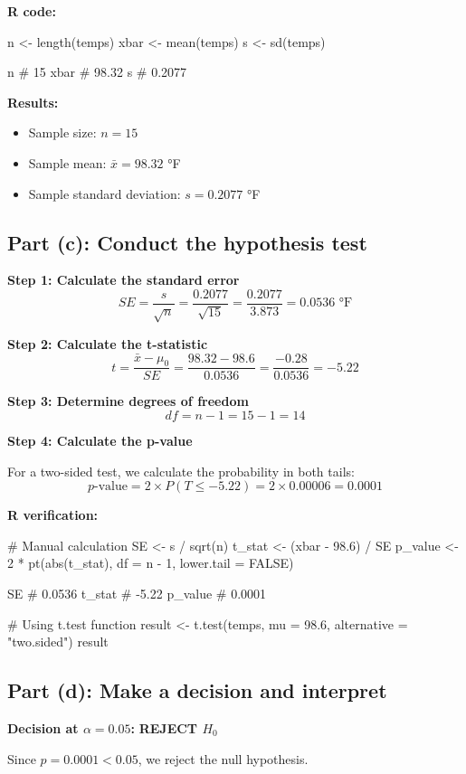 \documentclass[11pt]{article}
\begin{document}
\textbf{R code:}
\begin{rcode}
n <- length(temps)
xbar <- mean(temps)
s <- sd(temps)

n      # 15
xbar   # 98.32
s      # 0.2077
\end{rcode}

\textbf{Results:}
\begin{itemize}
\item Sample size: $n = 15$
\item Sample mean: $\bar{x} = 98.32$ °F
\item Sample standard deviation: $s = 0.2077$ °F
\end{itemize}

\subsection*{Part (c): Conduct the hypothesis test}

\textbf{Step 1: Calculate the standard error}
$$SE = \frac{s}{\sqrt{n}} = \frac{0.2077}{\sqrt{15}} = \frac{0.2077}{3.873} = 0.0536 \text{ °F}$$

\textbf{Step 2: Calculate the t-statistic}
$$t = \frac{\bar{x} - \mu_0}{SE} = \frac{98.32 - 98.6}{0.0536} = \frac{-0.28}{0.0536} = -5.22$$

\textbf{Step 3: Determine degrees of freedom}
$$df = n - 1 = 15 - 1 = 14$$

\textbf{Step 4: Calculate the p-value}

For a two-sided test, we calculate the probability in both tails:
$$p\text{-value} = 2 \times P(T \leq -5.22) = 2 \times 0.00006 = 0.0001$$

\textbf{R verification:}
\begin{rcode}
# Manual calculation
SE <- s / sqrt(n)
t_stat <- (xbar - 98.6) / SE
p_value <- 2 * pt(abs(t_stat), df = n - 1, lower.tail = FALSE)

SE        # 0.0536
t_stat    # -5.22
p_value   # 0.0001

# Using t.test function
result <- t.test(temps, mu = 98.6, alternative = "two.sided")
result
\end{rcode}

\subsection*{Part (d): Make a decision and interpret}

\textbf{Decision at $\alpha = 0.05$:} \textbf{REJECT $H_0$}

Since $p = 0.0001 < 0.05$, we reject the null hypothesis.
\end{document}
